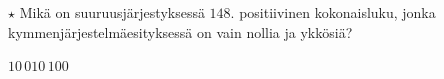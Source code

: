 \begin{tehtavasivu}
\begin{tehtava}
	$\star$ Mikä on suuruusjärjestyksessä $148$. positiivinen kokonaisluku, jonka kymmenjärjestelmäesityksessä on vain nollia ja ykkösiä?
	\begin{vastaus}
		$10\,010\,100$
	\end{vastaus}
\end{tehtava}

%

\end{tehtavasivu}
